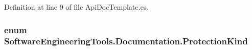 Definition at line 9 of file Api\+Doc\+Template.\+cs.

\hypertarget{namespace_software_engineering_tools_1_1_documentation_a13e97a0c26548dff4f60343d779c8040}{
\subsubsection[{Protection\+Kind}]{\setlength{\rightskip}{0pt plus 5cm}enum {\bf Software\+Engineering\+Tools.\+Documentation.\+Protection\+Kind}}}\label{namespace_software_engineering_tools_1_1_documentation_a13e97a0c26548dff4f60343d779c8040}
